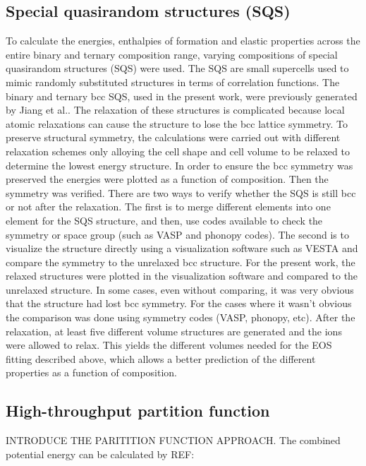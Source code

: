 \subsection{Special quasirandom structures (SQS)}

To calculate the energies, enthalpies of formation and elastic properties across the entire binary and ternary composition range, varying compositions of special quasirandom structures (SQS) were used. The SQS are small supercells used to mimic randomly substituted structures in terms of correlation functions. The binary and ternary bcc SQS, used in the present work, were previously generated by Jiang et al.\cite{Jiang2004,Jiang2009}. The relaxation of these structures is complicated because local atomic relaxations can cause the structure to lose the bcc lattice symmetry. To preserve structural symmetry, the calculations were carried out with different relaxation schemes only alloying the cell shape and cell volume to be relaxed to determine the lowest energy structure. In order to ensure the bcc symmetry was preserved the energies were plotted as a function of composition. Then the symmetry was verified. There are two ways to verify whether the SQS is still bcc or not after the relaxation. The first is to merge different elements into one element for the SQS structure, and then, use codes available to check the symmetry or space group (such as VASP and phonopy codes). The second is to visualize the structure directly using a visualization software such as VESTA and compare the symmetry to the unrelaxed bcc structure. For the present work, the relaxed structures were plotted in the visualization software and compared to the unrelaxed structure. In some cases, even without comparing, it was very obvious that the structure had lost bcc symmetry. For the cases where it wasn't obvious the comparison was done using symmetry codes (VASP, phonopy, etc). After the relaxation, at least five different volume structures are generated and the ions were allowed to relax. This yields the different volumes needed for the EOS fitting described above, which allows a better prediction of the different properties as a function of composition. 

\subsection{High-throughput partition function}

INTRODUCE THE PARITITION FUNCTION APPROACH. The combined potential energy can be calculated by REF:

